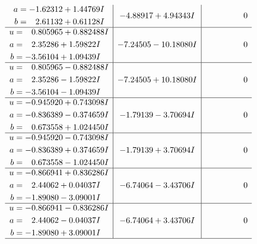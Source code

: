 \documentclass[1p]{elsarticle_modified}
\theoremstyle{definition}
\begin{document}
$$\begin{array}{c|c|c}
\begin{aligned}
a &= -1.62312 + 1.44769 I \\
b &= \phantom{-}2.61132 + 0.61128 I\end{aligned}
 & -4.88917 + 4.94343 I & \phantom{-0.000000 } 0 \\ \hline\begin{aligned}
u &= \phantom{-}0.805965 + 0.882488 I \\
a &= \phantom{-}2.35286 + 1.59822 I \\
b &= -3.56104 + 1.09439 I\end{aligned}
 & -7.24505 - 10.18080 I & \phantom{-0.000000 } 0 \\ \hline\begin{aligned}
u &= \phantom{-}0.805965 - 0.882488 I \\
a &= \phantom{-}2.35286 - 1.59822 I \\
b &= -3.56104 - 1.09439 I\end{aligned}
 & -7.24505 + 10.18080 I & \phantom{-0.000000 } 0 \\ \hline\begin{aligned}
u &= -0.945920 + 0.743098 I \\
a &= -0.836389 - 0.374659 I \\
b &= \phantom{-}0.673558 + 1.024450 I\end{aligned}
 & -1.79139 - 3.70694 I & \phantom{-0.000000 } 0 \\ \hline\begin{aligned}
u &= -0.945920 - 0.743098 I \\
a &= -0.836389 + 0.374659 I \\
b &= \phantom{-}0.673558 - 1.024450 I\end{aligned}
 & -1.79139 + 3.70694 I & \phantom{-0.000000 } 0 \\ \hline\begin{aligned}
u &= -0.866941 + 0.836286 I \\
a &= \phantom{-}2.44062 + 0.04037 I \\
b &= -1.89080 - 3.09001 I\end{aligned}
 & -6.74064 - 3.43706 I & \phantom{-0.000000 } 0 \\ \hline\begin{aligned}
u &= -0.866941 - 0.836286 I \\
a &= \phantom{-}2.44062 - 0.04037 I \\
b &= -1.89080 + 3.09001 I\end{aligned}
 & -6.74064 + 3.43706 I & \phantom{-0.000000 } 0\\
 \hline 
 \end{array}$$\newpage$$\begin{array}{c|c|c}  

\end{array}$$
\end{document}
